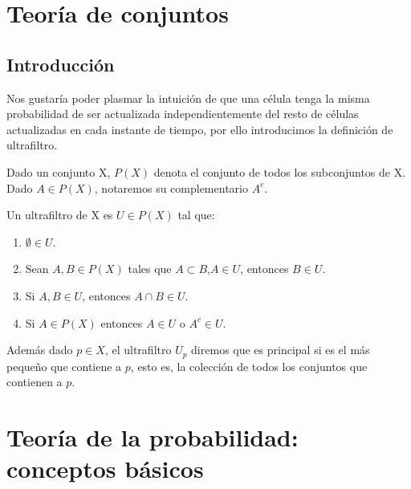 \documentclass[../proyecto.tex]{memoir}
\begin{document}
\section{Teoría de conjuntos}

\subsection{Introducción}


Nos gustaría poder plasmar la intuición de que una célula tenga la misma probabilidad de ser actualizada independientemente del resto de células actualizadas en cada instante de tiempo, por ello introducimos la definición de ultrafiltro. 

Dado un conjunto X, $P(X)$ denota el conjunto de todos los subconjuntos de X. Dado $A \in P(X)$, notaremos su complementario $A^{c}$. 
\begin{defi}
Un ultrafiltro de X es $U \in P(X)$ tal que:

\begin{enumerate}
\item $\emptyset \in U$.
\item Sean $A,B \in P(X)$ tales que $A \subset B$,$ A \in U$, entonces $B \in U$.
\item Si $A,B \in U$, entonces $A \cap B \in U$.
\item Si $A \in P(X)$ entonces $A \in U$ o $ A^{c} \in U$.
\end{enumerate}

Además dado $p \in X$, el ultrafiltro $U_{p}$ diremos que es principal si es el más pequeño que contiene a $p$, esto es, la colección de todos los conjuntos que contienen a $p$.
\end{defi}

\section{Teoría de la probabilidad: conceptos básicos}
\end{document}

